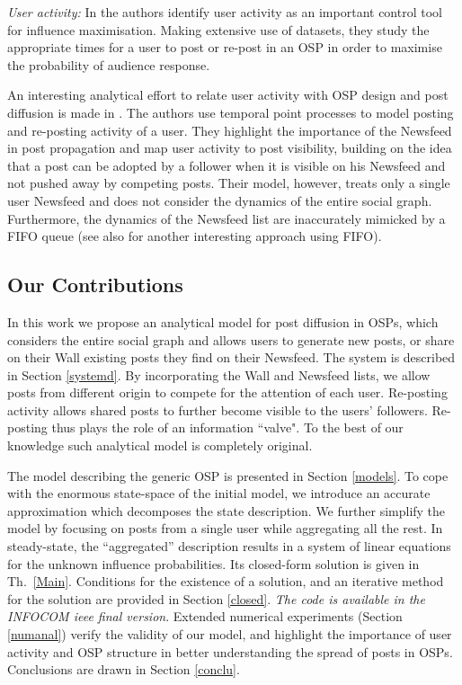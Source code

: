 \documentclass[10pt, conference, letterpaper]{IEEEtran}
\begin{document}
\textit{User activity:}  In \cite{WhenP} the authors identify user activity as an important control tool for influence maximisation. Making extensive use of datasets, they study the appropriate times for a user to post or re-post in an OSP in order to maximise the probability of audience response.

An interesting analytical effort to relate user activity with OSP design and post diffusion is made in \cite{SmartB16}. The authors use temporal point processes to model posting and re-posting activity of a user. They highlight the importance of the Newsfeed in post propagation and map user activity to post visibility, building on the idea that a post can be adopted by a follower when it is visible on his Newsfeed and not pushed away by competing posts. Their model, however, treats only a single user Newsfeed and does not consider the dynamics of the entire social graph. Furthermore, the dynamics of the Newsfeed list are inaccurately mimicked by a FIFO queue (see also \cite{TimelinesMenache} for another interesting approach using FIFO).%

\subsection{Our Contributions}
In this work we propose an analytical model for post diffusion in OSPs, which considers the entire social graph and allows users to generate new posts, or share on their Wall existing posts they find on their Newsfeed. %
The system is described in Section \ref{systemd}.
By incorporating the Wall and Newsfeed lists, we allow posts from different origin to compete for the attention of each user. %
Re-posting activity allows shared posts to further become visible to the users' followers. Re-posting thus plays the role of an information ``valve". To the best of our knowledge such analytical model is completely original. 

The model describing the generic OSP is presented in Section \ref{models}. To cope with the enormous state-space of the initial model, we introduce an accurate approximation which decomposes the state description. We further simplify the model by focusing on posts from a single user while aggregating all the rest. In steady-state, the ``aggregated'' description results in a system of linear equations for the unknown influence probabilities. Its closed-form solution is given in Th.~\ref{Main}. Conditions for the existence of a solution, and an iterative method for the solution are provided in Section \ref{closed}. \textit{The code is available in the INFOCOM ieee final version}. 
Extended numerical experiments (Section \ref{numanal}) verify the validity of our model, and highlight the importance of user activity and OSP structure in better understanding the spread of posts in OSPs. Conclusions are drawn in Section \ref{conclu}.
\end{document}
